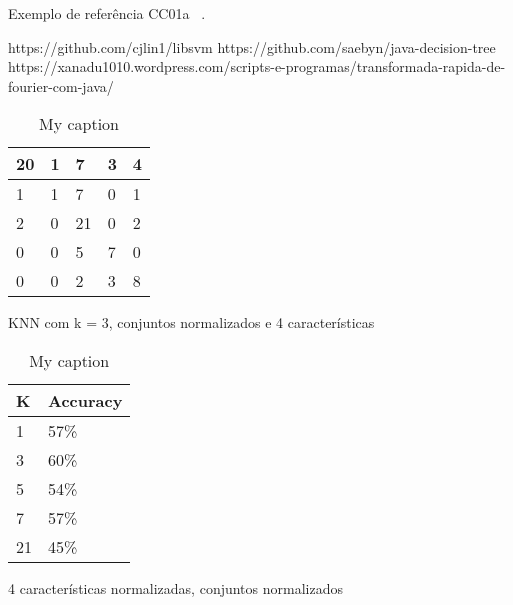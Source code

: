 \documentclass[12pt]{article}
\begin{document}
Exemplo de referência CC01a ~\cite{CC01}.

https://github.com/cjlin1/libsvm
https://github.com/saebyn/java-decision-tree
https://xanadu1010.wordpress.com/scripts-e-programas/transformada-rapida-de-fourier-com-java/

{}













\begin{table}[]
\centering
\caption{My caption}
\label{my-label}
\begin{tabular}{|l|l|l|l|l|}
\hline
20 & 1 & 7  & 3 & 4 \\ \hline
1  & 1 & 7  & 0 & 1 \\ \hline
2  & 0 & 21 & 0 & 2 \\ \hline
0  & 0 & 5  & 7 & 0 \\ \hline
0  & 0 & 2  & 3 & 8 \\ \hline
\end{tabular}
\end{table}
KNN com k = 3, conjuntos normalizados e 4 características



\begin{table}[]
\centering
\caption{My caption}
\label{my-label}
\begin{tabular}{|l|l|}
\hline
K  & Accuracy \\ \hline
1  & 57\%     \\ \hline
3  & 60\%     \\ \hline
5  & 54\%     \\ \hline
7  & 57\%     \\ \hline
21 & 45\%     \\ \hline
\end{tabular}
\end{table}
4 características normalizadas, conjuntos normalizados
\end{document}
